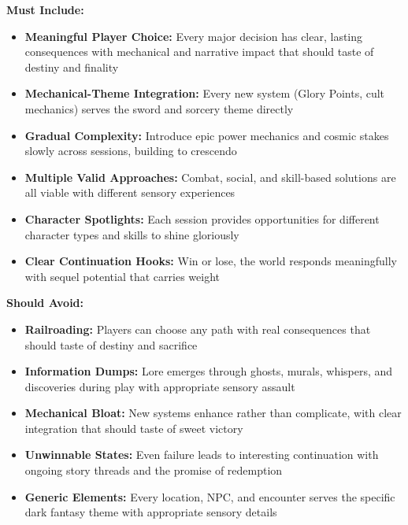 \documentclass[11pt]{article}
\begin{document}
\begin{itemize}
\begin{itemize}
\begin{itemize}
\textbf{Must Include:}
\begin{itemize}
\item \checkmark \textbf{Meaningful Player Choice:} Every major decision has clear, lasting consequences with mechanical and narrative impact that should taste of destiny and finality
\item \checkmark \textbf{Mechanical-Theme Integration:} Every new system (Glory Points, cult mechanics) serves the sword and sorcery theme directly
\item \checkmark \textbf{Gradual Complexity:} Introduce epic power mechanics and cosmic stakes slowly across sessions, building to crescendo
\item \checkmark \textbf{Multiple Valid Approaches:} Combat, social, and skill-based solutions are all viable with different sensory experiences
\item \checkmark \textbf{Character Spotlights:} Each session provides opportunities for different character types and skills to shine gloriously
\item \checkmark \textbf{Clear Continuation Hooks:} Win or lose, the world responds meaningfully with sequel potential that carries weight
\end{itemize}

\textbf{Should Avoid:}
\begin{itemize}
\item \checkmark \textbf{Railroading:} Players can choose any path with real consequences that should taste of destiny and sacrifice
\item \checkmark \textbf{Information Dumps:} Lore emerges through ghosts, murals, whispers, and discoveries during play with appropriate sensory assault
\item \checkmark \textbf{Mechanical Bloat:} New systems enhance rather than complicate, with clear integration that should taste of sweet victory
\item \checkmark \textbf{Unwinnable States:} Even failure leads to interesting continuation with ongoing story threads and the promise of redemption
\item \checkmark \textbf{Generic Elements:} Every location, NPC, and encounter serves the specific dark fantasy theme with appropriate sensory details
\end{itemize}


\end{itemize}
\end{itemize}
\end{itemize}
\end{document}
